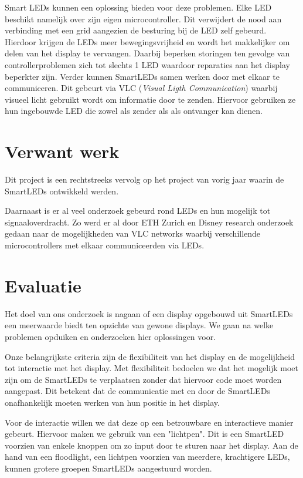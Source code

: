 \documentclass{article}
\begin{document}
Smart LEDs kunnen een oplossing bieden voor deze problemen. Elke LED beschikt namelijk over zijn eigen microcontroller. Dit verwijdert de nood aan verbinding met een grid aangezien de besturing bij de LED zelf gebeurd. Hierdoor krijgen de LEDs meer bewegingsvrijheid en wordt het makkelijker om delen van het display te vervangen. Daarbij beperken storingen ten gevolge van controllerproblemen zich tot slechts 1 LED waardoor reparaties aan het display beperkter zijn.  Verder kunnen SmartLEDs samen werken door met elkaar te communiceren. Dit gebeurt via VLC (\textit{Visual Ligth Communication}) waarbij visueel licht gebruikt wordt om informatie door te zenden\cite{VLC}. Hiervoor gebruiken ze hun ingebouwde LED die zowel als zender als als ontvanger kan dienen. 


\section{Verwant werk}
Dit project is een rechtstreeks vervolg op het project van vorig jaar waarin de SmartLEDs ontwikkeld werden. 

Daarnaast is er al veel onderzoek gebeurd rond LEDs en hun mogelijk tot signaaloverdracht. Zo werd er al door ETH Zurich en Disney research onderzoek gedaan naar de mogelijkheden van VLC networks waarbij verschillende microcontrollers met elkaar communiceerden via LEDs\cite{VLCNetworks}.


\section{Evaluatie}

Het doel van ons onderzoek is nagaan of een display opgebouwd uit SmartLEDs een meerwaarde biedt ten opzichte van gewone displays. We gaan na welke problemen opduiken en onderzoeken hier oplossingen voor.

Onze belangrijkste criteria zijn de flexibiliteit van het display en de mogelijkheid tot interactie met het display. Met flexibiliteit bedoelen we dat het mogelijk moet zijn om de SmartLEDs te verplaatsen zonder dat hiervoor code moet worden aangepast. Dit betekent dat de communicatie met en door de SmartLEDs onafhankelijk moeten werken van hun positie in het display. 

Voor de interactie willen we dat deze op een betrouwbare en interactieve manier gebeurt. Hiervoor maken we gebruik van een "lichtpen". Dit is een SmartLED voorzien van enkele knoppen om zo input door te sturen naar het display. Aan de hand van een floodlight, een lichtpen voorzien van meerdere, krachtigere LEDs, kunnen grotere groepen SmartLEDs aangestuurd worden.
\end{document}
